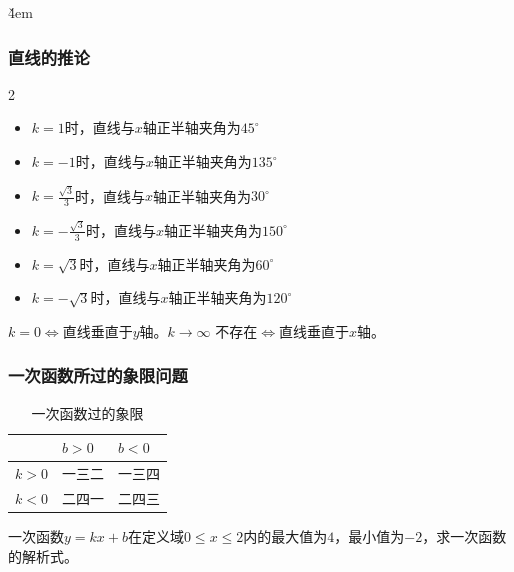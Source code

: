 \v{4em}

\subsubsection{直线的推论}

\begin{corollary}
    \begin{multicols}{2}
        \begin{itemize}
            \item $k=1$时，直线与$x$轴正半轴夹角为$45^\circ$
            \item $k=-1$时，直线与$x$轴正半轴夹角为$135^\circ$
            \item $k=\frac{\sqrt3}{3}$时，直线与$x$轴正半轴夹角为$30^\circ$
                  \columnbreak
            \item $k=-\frac{\sqrt3}{3}$时，直线与$x$轴正半轴夹角为$150^\circ$
            \item $k=\sqrt3$时，直线与$x$轴正半轴夹角为$60^\circ$
            \item $k=-\sqrt3$时，直线与$x$轴正半轴夹角为$120^\circ$
        \end{itemize}
    \end{multicols}
\end{corollary}

\begin{corollary}
    $k=0\Leftrightarrow$直线垂直于$y$轴。$k\to \infty$ 不存在$\Leftrightarrow$直线垂直于$x$轴。
\end{corollary}

\subsubsection{一次函数所过的象限问题}

\begin{table}[ht]
    \centering
    \caption{一次函数过的象限}
    \begin{tabular}{l|l|l}
              & $b>0$ & $b<0$ \\
        \hline
        $k>0$ & 一三二   & 一三四   \\
        \hline
        $k<0$ & 二四一   & 二四三   \\
        \hline
    \end{tabular}
\end{table}

\begin{example}
    一次函数$y=kx+b$在定义域$0\le x \le 2$内的最大值为$4$，最小值为$−2$，求一次函数的解析式。
\end{example}

